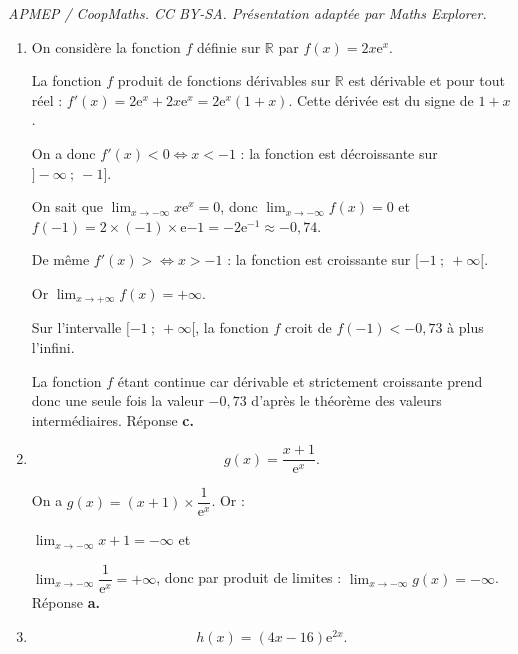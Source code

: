\documentclass[10pt]{article}
\providecommand{\R}{\mathbb{R}}
\providecommand{\e}{{\mathrm{e}}}
\begin{document}
\noindent\textit{APMEP / CoopMaths. CC BY-SA. Présentation adaptée par Maths Explorer.}\par\medskip
\medskip






\begin{enumerate}
\item On considère la fonction $f$ définie sur $\R$ par $f(x) = 2x\e^x$.


La fonction $f$ produit de fonctions dérivables sur $\R$ est dérivable et pour tout réel : $f'(x) = 2\e^x + 2x\e^x = 2\e^x(1 + x)$. Cette dérivée est du signe de $1 + x$.

On a donc $f'(x) < 0 \iff x < - 1$ : la fonction est décroissante sur $]- \infty~;~- 1]$.

On sait que $\displaystyle\lim_{x \to -\infty} x\e^x = 0$, donc $\displaystyle\lim_{x \to -\infty}f(x) = 0$ et $f(-1) = 2 \times (- 1) \times \e{-1} = - 2\e^{-1} \approx - 0,74$.

De même $f'(x) >  \iff x > - 1$ : la fonction est croissante sur $[- 1~;~+ \infty[$.

Or  $\displaystyle\lim_{x \to +\infty}f(x) = + \infty$.

Sur l'intervalle $[- 1~;~+ \infty[$, la fonction $f$ croit de $f(-1) < -0,73$ à plus l'infini.

La fonction $f$ étant continue car dérivable et strictement croissante prend donc une seule fois la valeur $-0,73$ d'après le théorème des valeurs intermédiaires. Réponse \textbf{c.}






\item 
\[g(x) = \dfrac{x+ 1}{\e^x}.\]








On a $g(x) = (x + 1) \times \dfrac{1}{\e^x}$. Or :

$\displaystyle\lim_{x \to -\infty}x + 1= - \infty$ et 

$\displaystyle\lim_{x \to -\infty}\dfrac{1}{\e^x} = + \infty$, donc par produit de limites : $\displaystyle\lim_{x \to -\infty}g(x) = - \infty$. Réponse \textbf{a.}

\item 
\[h(x) = (4x - 16)\e^{2x}.\]














\end{enumerate}
\end{document}
